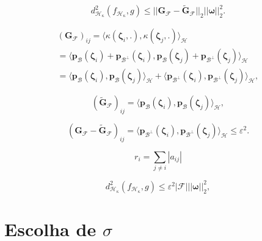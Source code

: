 \begin{equation}
    d_{\mathcal{H}_{\kappa}}^2(f_{\mathcal{H}_\kappa},g)  \leq ||\mathbf{G}_{\mathcal{F}} - \tilde{\mathbf{G}}_{\mathcal{F}}||_2 ||\boldsymbol{\omega}||^2_2.
\end{equation}

\begin{multline}
    \left( \mathbf{G}_{\mathcal{F}}\right)_{ij} = \langle \kappa(\boldsymbol{\zeta}_i,.),\kappa(\boldsymbol{\zeta}_j,.) \rangle_{\mathcal{H}}\\
    = \langle \mathbf{p}_{\mathcal{B}}(\boldsymbol{\zeta}_i) + \mathbf{p}_{\mathcal{B}^{\perp}}(\boldsymbol{\zeta}_i), \mathbf{p}_{\mathcal{B}}(\boldsymbol{\zeta}_j) + \mathbf{p}_{\mathcal{B}^{\perp}}(\boldsymbol{\zeta}_j) \rangle_{\mathcal{H}}\\
    = \langle \mathbf{p}_{\mathcal{B}}(\boldsymbol{\zeta}_i),\mathbf{p}_{\mathcal{B}}(\boldsymbol{\zeta}_j)\rangle_{\mathcal{H}} + \langle \mathbf{p}_{\mathcal{B}^\perp}(\boldsymbol{\zeta}_i),\mathbf{p}_{\mathcal{B}^\perp}(\boldsymbol{\zeta}_j)\rangle_{\mathcal{H}},
\end{multline}

\begin{equation}
    \left( \tilde{\mathbf{G}}_{\mathcal{F}}\right)_{ij} = \langle \mathbf{p}_{\mathcal{B}}(\boldsymbol{\zeta}_i),\mathbf{p}_{\mathcal{B}}(\boldsymbol{\zeta}_j)\rangle_{\mathcal{H}},
\end{equation}

\begin{equation}
    \left( \mathbf{G}_{\mathcal{F}} - \tilde{\mathbf{G}}_{\mathcal{F}}\right)_{ij} = \langle \mathbf{p}_{\mathcal{B}^\perp}(\boldsymbol{\zeta}_i),\mathbf{p}_{\mathcal{B}^\perp}(\boldsymbol{\zeta}_j)\rangle_{\mathcal{H}} \leq \varepsilon^2.
\end{equation}

\begin{equation}
    r_i = \sum_{j \neq i} |a_{ij}|
\end{equation}

\begin{equation}
    d_{\mathcal{H}_{\kappa}}^2(f_{\mathcal{H}_\kappa},g)  \leq \varepsilon^2|\mathcal{F}| ||\boldsymbol{\omega}||^2_2,
\end{equation}

\section{Escolha de $\sigma$}

